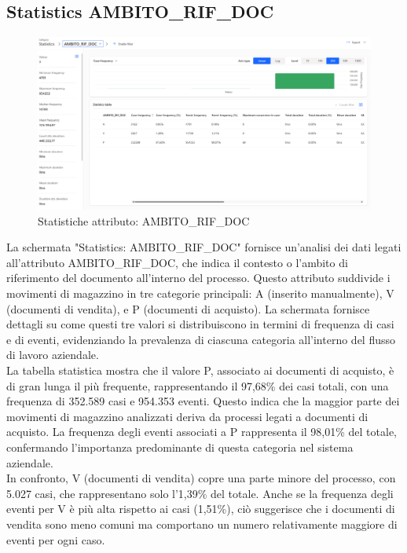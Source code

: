 \documentclass{article}
\begin{document}
\subsection{Statistics AMBITO\_RIF\_DOC}
\begin{figure}[H]
    \centering
    \includegraphics[width=\textwidth]{imgMicrosoft/DatiReali/StatisticsAMBITORIFDOCDatiReali.png}
    \caption{Statistiche attributo: AMBITO\_RIF\_DOC}
    \label{fig:statistics-AMBITO-RIF-DOC}
\end{figure}
La schermata "Statistics: AMBITO\_RIF\_DOC" fornisce un'analisi dei dati legati all'attributo AMBITO\_RIF\_DOC, che indica il contesto o l'ambito di riferimento del documento all'interno del processo. Questo attributo suddivide i movimenti di magazzino in tre categorie principali: A (inserito manualmente), V (documenti di vendita), e P (documenti di acquisto). La schermata fornisce dettagli su come questi tre valori si distribuiscono in termini di frequenza di casi e di eventi, evidenziando la prevalenza di ciascuna categoria all'interno del flusso di lavoro aziendale.\\
La tabella statistica mostra che il valore P, associato ai documenti di acquisto, è di gran lunga il più frequente, rappresentando il 97,68\% dei casi totali, con una frequenza di 352.589 casi e 954.353 eventi. Questo indica che la maggior parte dei movimenti di magazzino analizzati deriva da processi legati a documenti di acquisto. La frequenza degli eventi associati a P rappresenta il 98,01\% del totale, confermando l'importanza predominante di questa categoria nel sistema aziendale.\\
In confronto, V (documenti di vendita) copre una parte minore del processo, con 5.027 casi, che rappresentano solo l'1,39\% del totale. Anche se la frequenza degli eventi per V è più alta rispetto ai casi (1,51\%), ciò suggerisce che i documenti di vendita sono meno comuni ma comportano un numero relativamente maggiore di eventi per ogni caso.\\
\end{document}
